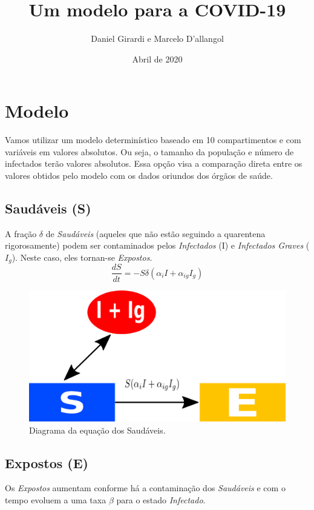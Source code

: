 \documentclass[12pt,letterpaper]{article}
\title{Um modelo para a COVID-19}
\author{Daniel Girardi e Marcelo D'allangol}
\date{Abril de 2020}
\begin{document}
\maketitle

\section{Modelo}

Vamos utilizar um modelo determinístico baseado em 10 compartimentos e com variáveis em valores absolutos. Ou seja, o tamanho da população e número de infectados terão valores absolutos. Essa opção visa a comparação direta entre os valores obtidos pelo modelo com os dados oriundos dos órgãos de saúde. 

\subsection{Saudáveis (S)}
A fração $\delta$ de \textit{Saudáveis} (aqueles que não estão seguindo a quarentena rigorosamente) podem ser contaminados pelos \textit{Infectados} (I) e \textit{Infectados Graves} ($I_g$). Neste caso, eles tornan-se \textit{Expostos}. 
\begin{equation}
	\frac{dS}{dt}= -S\delta(\alpha_i I +\alpha_{ig}I_g)
\end{equation}
\begin{figure}[!h]
	\centering
	\includegraphics[scale=0.4]{covidS}
	\caption{Diagrama da equação dos Saudáveis.}
	\label{fig:universe}
\end{figure}

\subsection{Expostos (E)}
Os \textit{Expostos} aumentam conforme há a contaminação dos \textit{Saudáveis} e com o tempo evoluem a uma taxa $\beta$ para o estado \textit{Infectado}.
\end{document}
